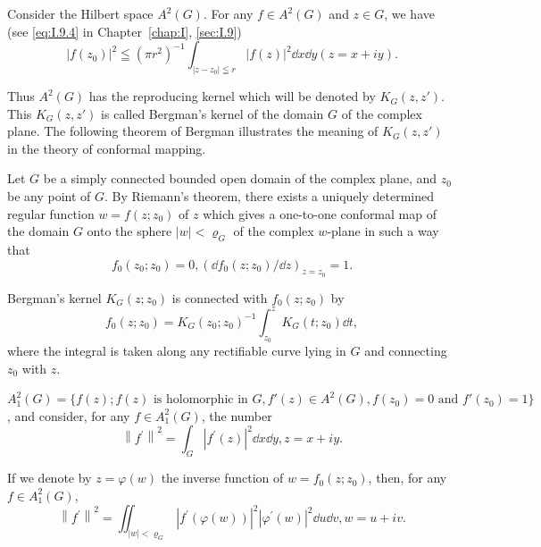 \begin{examplen} Consider the Hilbert space $A^2(G)$. For any $f \in A^2(G)$ and $z \in G$, we have (see \eqref{eq:I.9.4} in Chapter~\ref{chap:I}, \ref{sec:I.9})
\[
\left| f \left(z _{0}\right) \right| ^{2} \leqq (\pi r ^{2}) ^{-1} \int_ {\left| z - z _{0} \right| \leqq r} | f (z) | ^{2} \dd x \dd y (z = x + i y).
\]

Thus $A^2(G)$ has the reproducing kernel which will be denoted by $K_G(z, z')$. This $K_G(z, z')$ is called Bergman's kernel of the domain $G$ of the complex plane. The following theorem of Bergman illustrates the meaning of $K_G(z, z')$ in the theory of conformal mapping. 

\end{examplen}
\begin{theorem}\label{thm:III.9.Theorem.2} Let $G$ be a simply connected bounded open domain of the complex plane, and $z_{0}$ be any point of $G$. By Riemann's theorem, there exists a uniquely determined regular function $w = f(z; z_{0})$ of $z$ which gives a one-to-one conformal map of the domain $G$ onto the sphere $|w| < \varrho_{G}$ of the complex $w$-plane in such a way that 
\[
f _{0} (z _{0}; z _{0}) = 0, (\dd f _{0} (z; z _{0}) / \dd z) _ {z = z _{0}} = 1.
\]
\end{theorem}

Bergman's kernel $K_{G}(z;z_{0})$ is connected with $f_{0}(z;z_{0})$ by 
\begin{equation}\label{eq:III.9.8}
f _{0} (z; z _{0}) = K _{G} \left(z _{0}; z _{0}\right) ^{-1} \int_ {z _{0}} ^{z} K _{G} (t; z _{0}) \dd t,
\end{equation}
where the integral is taken along any rectifiable curve lying in $G$ and connecting $z_{0}$ with $z$. 

$A_{1}^{2}(G) = \{f(z); f(z)\text{ is holomorphic in } G, f'(z) \in A^{2}(G), f(z_{0}) = 0\text{ and } f'(z_{0}) = 1\}$, and consider, for any $f \in A_{1}^{2}(G)$, the number 
\begin{equation}\label{eq:III.9.9}
\left\| f ^{\prime} \right\| ^{2} = \int_{G} \left| f ^{\prime} (z) \right| ^{2} \dd x \dd y, z = x + i y.
\end{equation}

If we denote by $z = \varphi(w)$ the inverse function of $w = f_0(z; z_0)$, then, for any $f \in A_1^2(G)$, 
\[
\left\| f ^{\prime} \right\| ^{2} = \iint_ {| w | < \varrho_{G}} \left| f ^{\prime} (\varphi (w)) \right| ^{2} \left| \varphi^{\prime} (w) \right| ^{2} \dd u \dd v, w = u + i v.
\]

